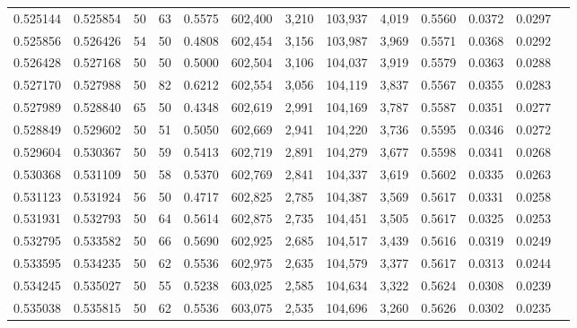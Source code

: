 \begin{tabular}{rrrrrrrrrrrrr}
0.525144 & 0.525854 &    50 &  63 &                                     0.5575 & 602,400 &   3,210 & 103,937 &   4,019 & 0.5560 & 0.0372 & 0.0297 \\
0.525856 & 0.526426 &    54 &  50 &                                     0.4808 & 602,454 &   3,156 & 103,987 &   3,969 & 0.5571 & 0.0368 & 0.0292 \\
0.526428 & 0.527168 &    50 &  50 &                                     0.5000 & 602,504 &   3,106 & 104,037 &   3,919 & 0.5579 & 0.0363 & 0.0288 \\
0.527170 & 0.527988 &    50 &  82 &                                     0.6212 & 602,554 &   3,056 & 104,119 &   3,837 & 0.5567 & 0.0355 & 0.0283 \\
0.527989 & 0.528840 &    65 &  50 &                                     0.4348 & 602,619 &   2,991 & 104,169 &   3,787 & 0.5587 & 0.0351 & 0.0277 \\
0.528849 & 0.529602 &    50 &  51 &                                     0.5050 & 602,669 &   2,941 & 104,220 &   3,736 & 0.5595 & 0.0346 & 0.0272 \\
0.529604 & 0.530367 &    50 &  59 &                                     0.5413 & 602,719 &   2,891 & 104,279 &   3,677 & 0.5598 & 0.0341 & 0.0268 \\
0.530368 & 0.531109 &    50 &  58 &                                     0.5370 & 602,769 &   2,841 & 104,337 &   3,619 & 0.5602 & 0.0335 & 0.0263 \\
0.531123 & 0.531924 &    56 &  50 &                                     0.4717 & 602,825 &   2,785 & 104,387 &   3,569 & 0.5617 & 0.0331 & 0.0258 \\
0.531931 & 0.532793 &    50 &  64 &                                     0.5614 & 602,875 &   2,735 & 104,451 &   3,505 & 0.5617 & 0.0325 & 0.0253 \\
0.532795 & 0.533582 &    50 &  66 &                                     0.5690 & 602,925 &   2,685 & 104,517 &   3,439 & 0.5616 & 0.0319 & 0.0249 \\
0.533595 & 0.534235 &    50 &  62 &                                     0.5536 & 602,975 &   2,635 & 104,579 &   3,377 & 0.5617 & 0.0313 & 0.0244 \\
0.534245 & 0.535027 &    50 &  55 &                                     0.5238 & 603,025 &   2,585 & 104,634 &   3,322 & 0.5624 & 0.0308 & 0.0239 \\
0.535038 & 0.535815 &    50 &  62 &                                     0.5536 & 603,075 &   2,535 & 104,696 &   3,260 & 0.5626 & 0.0302 & 0.0235 \\

\end{tabular}
